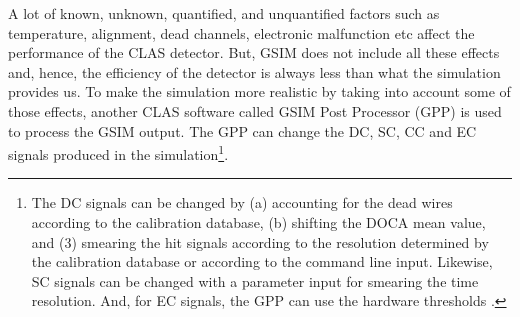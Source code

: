 A lot of known, unknown, quantified, and unquantified factors such as temperature, alignment, dead channels, electronic malfunction etc affect the performance of the CLAS detector. But, GSIM does not include all these effects and, hence, the efficiency of the detector is always less than what the simulation provides us. To make the simulation more realistic by taking into account some of those effects, another CLAS software called GSIM Post Processor (GPP) is used to process the GSIM output. The GPP can change the DC, SC, CC and EC signals produced in the simulation\footnote{The DC signals can be changed by (a) accounting for the dead wires according to the calibration database, (b) shifting the DOCA mean value, and (3) smearing the hit signals according to the resolution determined by the calibration database or according to the command line input. Likewise, SC signals can be changed with a parameter input for smearing the time resolution. And, for %
EC signals, the GPP can use the hardware thresholds \cite{jxZhang_th}.}.

